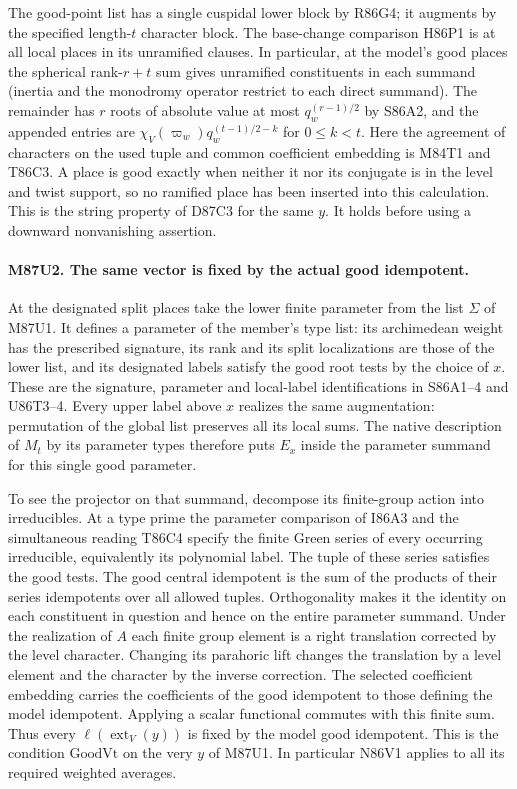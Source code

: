 The good-point list has a single cuspidal lower block by R86G4;
it augments by the specified length-$t$ character block. The
base-change comparison H86P1 is at all local places in its
unramified clauses. In particular, at the model's good places
the spherical rank-$r+t$ sum gives unramified constituents in
each summand (inertia and the monodromy operator restrict to
each direct summand). The remainder has $r$ roots of absolute
value at most $q_w^{(r-1)/2}$ by S86A2, and the appended
entries are $\chi_V(\varpi_w)q_w^{(t-1)/2-k}$ for $0\le k<t$.
Here the agreement of characters on the used tuple and common
coefficient embedding is M84T1 and T86C3. A place is good exactly
when neither it nor its conjugate is in the level and twist
support, so no ramified place has been inserted into this
calculation. This is the string property of D87C3 for the
same $y$. It holds before using a downward nonvanishing assertion.

\paragraph{M87U2. The same vector is fixed by the actual good idempotent.}
At the designated split places take the lower finite parameter
from the list $\Sigma$ of M87U1. It defines a parameter of
the member's type list: its archimedean weight has the prescribed
signature, its rank and its split localizations are those
of the lower list, and its designated labels satisfy the good
root tests by the choice of $x$. These are the signature, parameter
and local-label identifications in S86A1--4 and U86T3--4.
Every upper label above $x$ realizes the same augmentation:
permutation of the global list preserves all its local sums.
The native description of $M_t$ by its parameter types
therefore puts $E_x$ inside the parameter summand for this
single good parameter.

To see the projector on that summand, decompose its finite-group
action into irreducibles. At a type prime the parameter comparison
of I86A3 and the simultaneous reading T86C4 specify the
finite Green series of every occurring irreducible, equivalently
its polynomial label. The tuple of these series satisfies the
good tests. The good central idempotent is the sum of the products
of their series idempotents over all allowed tuples. Orthogonality
makes it the identity on each constituent in question and hence
on the entire parameter summand. Under the realization of $A$
each finite group element is a right translation corrected by the
level character. Changing its parahoric lift changes the translation
by a level element and the character by the inverse correction.
The selected coefficient embedding carries the coefficients of
the good idempotent to those defining the model idempotent.
Applying a scalar functional commutes with this finite sum.
Thus every $\ell(\operatorname{ext}_V(y))$ is fixed by the
model good idempotent. This is the condition $\mathrm{GoodVt}$
on the very $y$ of M87U1. In particular N86V1 applies to all its
required weighted averages.

